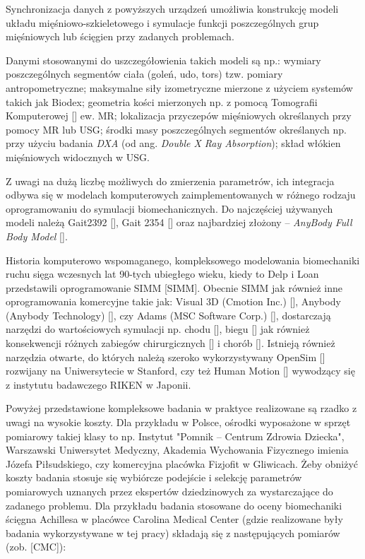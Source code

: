 Synchronizacja danych z powyższych urządzeń umożliwia konstrukcję modeli układu mięśniowo-szkieletowego i symulacje funkcji poszczególnych grup mięśniowych lub ścięgien przy zadanych problemach.

Danymi stosowanymi do uszczegółowienia takich modeli są np.: wymiary poszczególnych segmentów ciała (goleń, udo, tors) tzw. pomiary antropometryczne; maksymalne siły izometryczne mierzone z użyciem systemów takich jak Biodex; geometria kości mierzonych np. z pomocą Tomografii Komputerowej [] ew. MR; lokalizacja przyczepów mięśniowych określanych przy pomocy MR lub USG; środki masy poszczególnych segmentów określanych np. przy użyciu badania \textit{DXA} (od ang. \textit{Double X Ray Absorption}); skład włókien mięśniowych widocznych w USG.

Z uwagi na dużą liczbę możliwych do zmierzenia parametrów, ich integracja odbywa się w modelach komputerowych zaimplementowanych w różnego rodzaju oprogramowaniu do symulacji biomechanicznych. Do najczęściej używanych modeli należą Gait2392 [], Gait 2354 [] oraz najbardziej złożony -- \textit{AnyBody Full Body Model} []. 

Historia komputerowo wspomaganego, kompleksowego modelowania biomechaniki ruchu sięga wczesnych lat 90-tych ubiegłego wieku, kiedy to Delp i Loan przedstawili oprogramowanie SIMM [SIMM]. Obecnie SIMM jak również inne oprogramowania komercyjne takie jak: Visual 3D (Cmotion Inc.) [], Anybody (Anybody Technology) [], czy Adams (MSC Software Corp.) [], dostarczają narzędzi do wartościowych symulacji np. chodu [], biegu [] jak również konsekwencji różnych zabiegów chirurgicznych [] i chorób []. Istnieją również narzędzia otwarte, do których należą szeroko wykorzystywany OpenSim [] rozwijany na Uniwersytecie w Stanford, czy też Human Motion [] wywodzący się z instytutu badawczego RIKEN w Japonii.

Powyżej przedstawione kompleksowe badania w praktyce realizowane są rzadko z uwagi na wysokie koszty. Dla przykładu w Polsce, ośrodki wyposażone w sprzęt pomiarowy takiej klasy to np. Instytut "Pomnik – Centrum Zdrowia Dziecka", Warszawski Uniwersytet Medyczny, Akademia Wychowania Fizycznego imienia Józefa Piłsudskiego, czy komercyjna placówka Fizjofit w Gliwicach. Żeby obniżyć koszty badania stosuje się wybiórcze podejście i selekcję parametrów pomiarowych uznanych przez ekspertów dziedzinowych za wystarczające do zadanego problemu. Dla przykładu badania stosowane do oceny biomechaniki ścięgna Achillesa w placówce Carolina Medical Center (gdzie realizowane były badania wykorzystywane w tej pracy) składają się z następujących pomiarów (zob. [CMC]):

